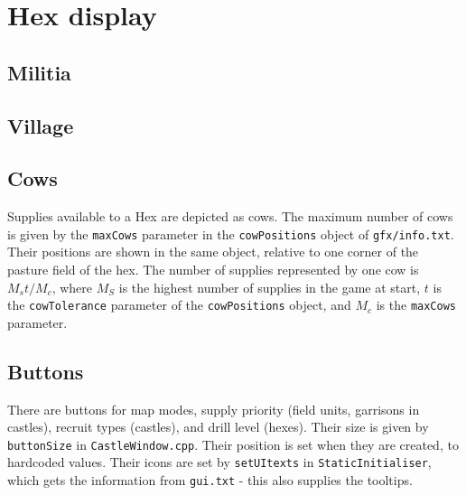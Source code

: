 \documentclass[12pt,ebook,oneside]{book}
\begin{document}
\section{Hex display}

\subsection{Militia}

\subsection{Village}

\subsection{Cows}

Supplies available to a Hex are depicted as cows. The maximum number
of cows is given by the \texttt{maxCows} parameter in the
\texttt{cowPositions} object of \texttt{gfx/info.txt}. Their positions
are shown in the same object, relative to one corner of the pasture
field of the hex. The number of supplies represented by one cow is
$M_st/M_c$, where $M_S$ is the highest number of supplies in the game
at start, $t$ is the \texttt{cowTolerance} parameter of the
\texttt{cowPositions} object, and $M_c$ is the \texttt{maxCows}
parameter. 

\subsection{Buttons}

There are buttons for map modes, supply priority (field units,
garrisons in castles), recruit types (castles), and drill level
(hexes). Their size is given by \texttt{buttonSize} in
\texttt{CastleWindow.cpp}. Their position is set when they are
created, to hardcoded values. Their icons are set by
\texttt{setUItexts} in \texttt{StaticInitialiser}, which gets the
information from \texttt{gui.txt} - this also supplies the tooltips.
\end{document}
